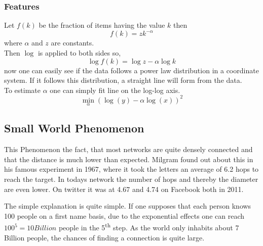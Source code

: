 	\subsubsection{Features} %
	\label{ssub:features}
		Let $f(k)$ be the fraction of items having the value $k$ then
		\begin{equation}
		\label{eq:powerlaw}
			f(k) = zk^{-\alpha}
		\end{equation}
		where $\alpha$ and $z$ are constants.\\
		Then $\log$ is applied to both sides so,
		\begin{equation}
			\log f(k) = \log z - \alpha\log k
		\end{equation}
		now one can easily see if the data follows a power law distribution in a coordinate system.
		If it follows this distribution,
		a straight line will form from the data.\\
		To estimate $\alpha$ one can simply fit line on the log-log axis.
		\begin{equation}
			\min_{\alpha}(\log(y) - \alpha\log(x))^2
		\end{equation}

\subsection{Small World Phenomenon} %
\label{sub:small_world_phenomenon}
This Phenomenon the fact,
that most networks are quite densely connected
and that the distance is much lower than expected.
Milgram found out about this in his famous experiment in 1967,
where it took the letters an average of 6.2 hops to reach the target.
In todays network the number of hops 
and thereby the diameter are even lower.
On twitter it was at 4.67 and 4.74 on Facebook both in 2011.

The simple explanation is quite simple.
If one supposes that each person knows 100 people on a first name basis,
due to the exponential effects one can reach $100^5 = 10 Billion$ people in the 5\textsuperscript{th} step.
As the world only inhabits about 7 Billion people,
the chances of finding a connection is quite large.

